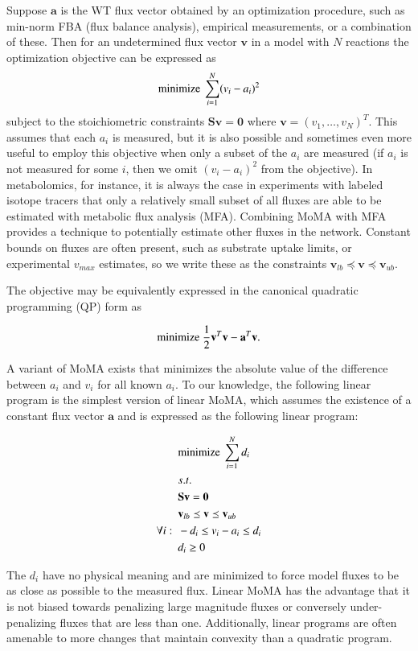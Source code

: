 \documentclass[phd,tocprelim]{cornell}
\theoremstyle{break}
\theoremstyle{empty}
\begin{document}
Suppose $\mathbf{a}$ is the WT flux vector obtained by an optimization procedure, 
such as min-norm FBA (flux balance analysis), empirical measurements, or a
combination of these. Then for an undetermined flux vector $\mathbf{v}$ in a model 
with $N$ reactions the optimization objective can be expressed as
\[ \textnormal{minimize}\ \sum^N_{i=1}(v_i-a_i)^2 \]
subject to the stoichiometric constraints $\mathbf{S v} = \mathbf{0}$
where $\mathbf{v} = (v_1, \ldots, v_N)^T$. This assumes that each $a_i$ is measured,
but it is also possible and sometimes even more useful to employ this objective when only
a subset of the $a_i$ are measured (if $a_i$ is not measured for some $i$, then we omit
$(v_i-a_i)^2$ from the objective). In metabolomics, for instance, it is always the case in experiments with 
labeled isotope tracers that only a relatively small subset of all fluxes are able to be estimated 
with metabolic flux analysis (MFA). Combining MoMA with MFA provides a technique to 
potentially estimate other fluxes in the network. 
Constant bounds on fluxes are often present, such as substrate uptake
limits, or experimental $v_{max}$ estimates, so we write these as the
constraints $\mathbf{v}_{lb} \preceq \mathbf{v} \preceq
\mathbf{v}_{ub}$.

The objective may be equivalently expressed in the 
canonical quadratic programming (QP) form as

\[ \textnormal{minimize}\ \frac{1}{2}\mathbf{v}^T \mathbf{v} - \mathbf{a}^T \mathbf{v}\textnormal{.}\]

A variant of MoMA exists that minimizes the absolute value of the
difference between $a_i$ and $v_i$ for all known $a_i$. To our
knowledge, the following linear program is the simplest version of
linear MoMA, which assumes the existence of a constant flux vector
$\mathbf{a}$ and is expressed as the following linear program:

\begin{align*}
&\textnormal{minimize}\ \sum^N_{i=1}d_i  \\
&s.t.\\
&\mathbf{S v} = \mathbf{0} \\
&\mathbf{v}_{lb} \preceq \mathbf{v} \preceq \mathbf{v}_{ub} \\
\forall i:~~&-d_i \le v_i-a_i \le d_i \\
&d_i \ge 0
\end{align*}

The $d_i$ have no physical meaning and are minimized to force model
fluxes to be as close as possible to the measured flux.  Linear MoMA
has the advantage that it is not biased towards penalizing large
magnitude fluxes or conversely under-penalizing fluxes that are less
than one. Additionally, linear programs are often amenable to more
changes that maintain convexity than a quadratic program.
\end{document}
